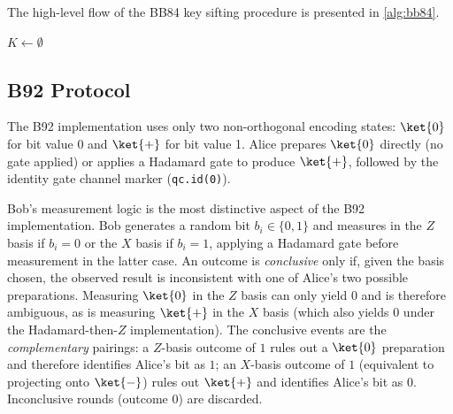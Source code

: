   {}%

The high-level flow of the BB84 key sifting procedure is presented in \cref{alg:bb84}.

\begin{algorithm}[H]
    \caption{BB84 Key Sifting Procedure}\label{alg:bb84}
    $K \leftarrow \emptyset$\;
\end{algorithm}


\subsection{B92 Protocol}

The B92 implementation uses only two non-orthogonal encoding states: $\ket{0}$ for bit value 0 and $\ket{+}$ for bit value 1. Alice prepares $\ket{0}$ directly (no gate applied) or applies a Hadamard gate to produce $\ket{+}$, followed by the identity gate channel marker (\texttt{qc.id(0)}).

Bob's measurement logic is the most distinctive aspect of the B92 implementation. Bob generates a random bit $b_i \in \{0, 1\}$ and measures in the $Z$ basis if $b_i = 0$ or the $X$ basis if $b_i = 1$, applying a Hadamard gate before measurement in the latter case. An outcome is \textit{conclusive} only if, given the basis chosen, the observed result is inconsistent with one of Alice's two possible preparations. Measuring $\ket{0}$ in the $Z$ basis can only yield $0$ and is therefore ambiguous, as is measuring $\ket{+}$ in the $X$ basis (which also yields $0$ under the Hadamard-then-$Z$ implementation). The conclusive events are the \emph{complementary} pairings: a $Z$-basis outcome of $1$ rules out a $\ket{0}$ preparation and therefore identifies Alice's bit as $1$; an $X$-basis outcome of $1$ (equivalent to projecting onto $\ket{-}$) rules out $\ket{+}$ and identifies Alice's bit as $0$. Inconclusive rounds (outcome $0$) are discarded.


